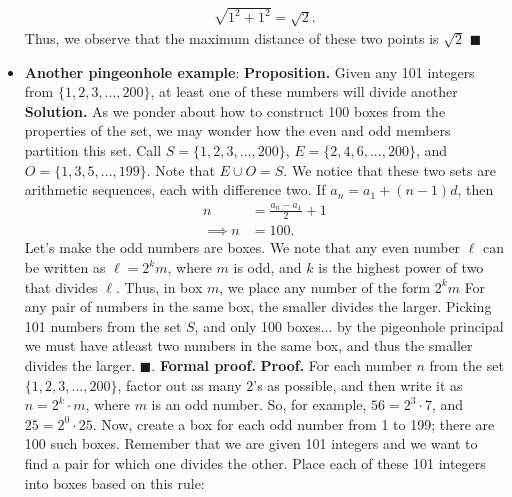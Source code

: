 \documentclass{report}
\begin{document}
\begin{itemize}
            \begin{align*}
                \sqrt{1^{2} + 1^{2}} = \sqrt{2}
            .\end{align*}
            Thus, we observe that the maximum distance of these two points is $\sqrt{2}$ $\blacksquare$
        \item \textbf{Another pingeonhole example}:
            \bigbreak \noindent 
            \textbf{Proposition.} Given any 101 integers from $\{1, 2, 3, . . . , 200\}$, at least one of these numbers will divide another
            \bigbreak \noindent 
            \textbf{Solution.} As we ponder about how to construct 100 boxes from the properties of the set, we may wonder how the even and odd members partition this set. Call $S = \{1,2,3,...,200\} $, $E=\{2,4,6,...,200\} $, and $O = \{1,3,5,...,199\} $. Note that $E \cup O = S$. We notice that these two sets are arithmetic sequences, each with difference two. If $a_{n} = a_{1} +  (n-1)d$, then 
            \begin{align*}
                n &= \frac{a_{n} - a_{1}}{2} + 1 \\
                \implies n&= 100
            .\end{align*}
            \bigbreak \noindent 
            Let's make the odd numbers are boxes. We note that any even number $\ell$ can be written as $\ell = 2^{k}m$, where $m$ is odd, and $k$ is the highest power of two that divides $\ell$. Thus, in box $m$, we place any number of the form $2^{k}m$
            \bigbreak \noindent 
            \bigbreak \noindent 
            For any pair of numbers in the same box, the smaller divides the larger. Picking 101 numbers from the set $S$, and only 100 boxes... by the pigeonhole principal we must have atleast two numbers in the same box, and thus the smaller divides the larger. $\blacksquare$.
            \bigbreak \noindent 
            \textbf{Formal proof.} 
            \textbf{Proof.} For each number $n$ from the set $\{1, 2, 3, \dots, 200\}$, factor out as many 2's as possible, and then write it as $n = 2^k \cdot m$, where $m$ is an odd number. So, for example, $56 = 2^3 \cdot 7$, and $25 = 2^0 \cdot 25$. Now, create a box for each odd number from 1 to 199; there are 100 such boxes.
            \bigbreak \noindent 
            Remember that we are given 101 integers and we want to find a pair for which one divides the other. Place each of these 101 integers into boxes based on this rule:
            \bigbreak \noindent 
            \begin{quote}

\end{quote}
\end{itemize}
\end{document}
